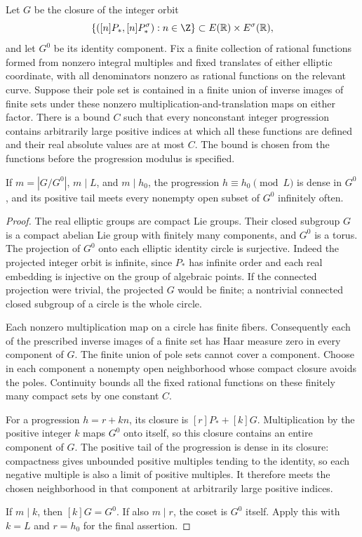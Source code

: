 \begin{lemma}
\label{v5:real-progression-bridge}
Let $G$ be the closure of the integer orbit
\[
 \{([n]P_*,[n]P_*^\sigma):n\in\Z\}
       \subset E(\mathbb R)\times E^\sigma(\mathbb R),
\]
and let $G^0$ be its identity component. Fix a finite collection of
rational functions formed from nonzero integral multiples and fixed
translates of either elliptic coordinate, with all denominators
nonzero as rational functions on the relevant curve. Suppose their
pole set is contained in a finite union of inverse images of finite
sets under these nonzero multiplication-and-translation maps on
either factor. There is a bound $C$ such that every nonconstant
integer progression contains arbitrarily large positive indices at
which all these functions are defined and their real absolute values
are at most $C$. The bound is chosen from the functions before the
progression modulus is specified.

If $m=|G/G^0|$, $m\mid L$, and $m\mid h_0$, the progression
$h\equiv h_0\pmod L$ is dense in $G^0$, and its positive tail
meets every nonempty open subset of $G^0$ infinitely often.
\end{lemma}

\begin{proof}
The real elliptic groups are compact Lie groups. Their closed
subgroup $G$ is a compact abelian Lie group with finitely many
components, and $G^0$ is a torus. The projection of $G^0$ onto
each elliptic identity circle is surjective. Indeed the projected
integer orbit is infinite, since $P_*$ has infinite order and each
real embedding is injective on the group of algebraic points.
If the connected projection were trivial, the projected $G$ would
be finite; a nontrivial connected closed subgroup of a circle is
the whole circle.

Each nonzero multiplication map on a circle has finite fibers.
Consequently each of the prescribed inverse images of a finite
set has Haar measure zero in every component of $G$. The finite
union of pole sets cannot cover a component. Choose in each
component a nonempty open neighborhood whose compact closure
avoids the poles. Continuity bounds all the fixed rational
functions on these finitely many compact sets by one constant $C$.

For a progression $h=r+kn$, its closure is
$[r]P_*+[k]G$. Multiplication by the positive integer $k$ maps
$G^0$ onto itself, so this closure contains an entire component
of $G$. The positive tail of the progression is dense in its
closure: compactness gives unbounded positive multiples tending
to the identity, so each negative multiple is also a limit of
positive multiples. It therefore meets the chosen neighborhood
in that component at arbitrarily large positive indices.

If $m\mid k$, then $[k]G=G^0$. If also $m\mid r$, the coset
is $G^0$ itself. Apply this with $k=L$ and $r=h_0$ for the final
assertion.
\end{proof}

